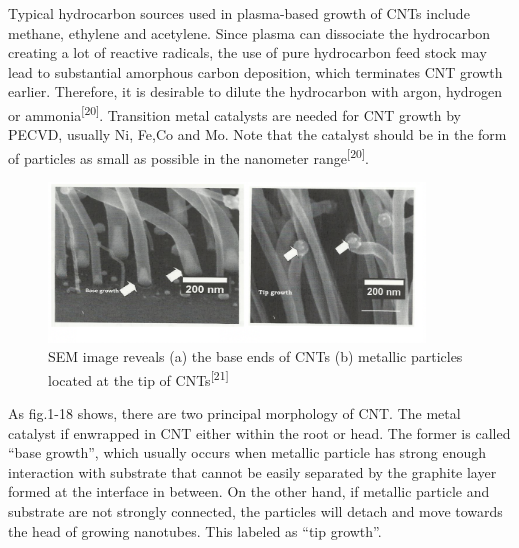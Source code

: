 Typical hydrocarbon sources used in plasma-based growth of CNTs include methane, ethylene and acetylene. Since plasma can dissociate the hydrocarbon creating a lot of reactive radicals, the use of pure hydrocarbon feed stock may lead to substantial amorphous carbon deposition, which terminates CNT growth earlier. Therefore, it is desirable to dilute the hydrocarbon with argon, hydrogen or ammonia\textsuperscript{[20]}.
Transition metal catalysts are needed for CNT growth by PECVD, usually Ni, Fe,Co and Mo. Note that the catalyst should be in the form of particles as small as possible in the nanometer range\textsuperscript{[20]}.
\begin{figure}[H]
\centering
\includegraphics[width=10cm]{src/fig/fig18.png}
\caption{SEM image reveals (a) the base ends of CNTs (b) metallic particles located at the tip of CNTs\textsuperscript{[21]}}
\end{figure}

As fig.1-18 shows, there are two principal morphology of CNT.  The metal catalyst if enwrapped in CNT either within the root or  head. The former is called “base growth”, which usually occurs when metallic particle has strong enough interaction with substrate that cannot be easily separated by the graphite layer formed at the interface in between. On the other hand, if metallic particle and substrate are not strongly connected, the particles will detach and move towards the head of growing nanotubes. This labeled as “tip growth”. 

